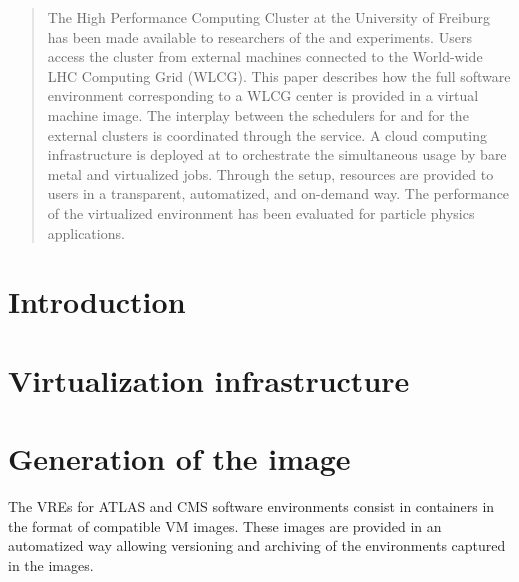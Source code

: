 \date{Received: date / Accepted: date}


\maketitle

\begin{abstract}
The \NEMO High Performance Computing Cluster at the University of
Frei\-burg has been made available to
researchers of the \ATLAS and \CMS experiments.
Users access the cluster from external machines connected to the
World-wide LHC Computing Grid (WLCG).
 This paper describes how the full software environment corresponding to a WLCG center
 is provided in a virtual machine image. The interplay between the
 schedulers for \NEMO and for the external
 clusters is coordinated through the \Roced service.
A cloud computing infrastructure is deployed at \NEMO to orchestrate the
simultaneous usage by bare metal and virtualized jobs.
Through the setup, resources are provided to users in a transparent,
automatized, and
on-demand way. The performance of the virtualized environment has been
evaluated for particle physics applications.

\end{abstract}




\section{Introduction}
\label{intro}


\section{Virtualization infrastructure}
\label{sec:openstack}


\section{Generation of the image}
The VREs for ATLAS and CMS software environments consist in \Openstack containers
in the format of compatible VM images.
These images are provided in an automatized
way allowing versioning and archiving of the environments captured in
the images.

